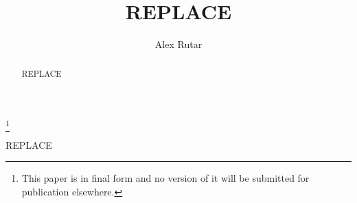 \documentclass[12pt]{amsart}
\newcommand{\shorttitlename}{REPLACE}
\newcommand{\titlename}{REPLACE}
\begin{document}
\title[\shorttitlename]{\titlename}
\author{Alex Rutar}
\address{University of Waterloo, 137 University Ave W, Waterloo, ON}
\thanks{This paper is in final form and no version of it will be submitted for publication elsewhere.}

\begin{abstract}
    REPLACE
\end{abstract}

\maketitle
\tableofcontents

REPLACE



\end{document}
